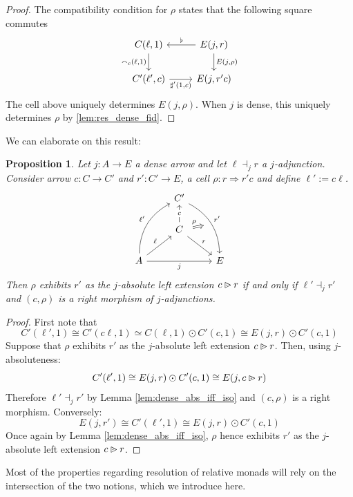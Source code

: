 \documentclass[10pt,a4paper]{article}
\newcommand{\To}{\Rightarrow}
\newcommand{\plext}{\mathbin{{\rhd}\mathclap{\mspace{-17.5mu}\cdot}}}
\newcommand{\simeqq}{\cong}
\theoremstyle{plain}
\newtheorem{proposition}[theorem]{Proposition}
\theoremstyle{definition}
\theoremstyle{remark}
\begin{document}
\begin{proof}
    The compatibility condition for $\rho$ states that the following square commutes
    \[\begin{tikzcd}
        \ar[d, "{\smallfrown_c(\ell, 1)}"'] C(\ell, 1) & \ar[l, "\flat"'] E(j, r) \ar[d, "{E(j, \rho)}"]\\
        C'(\ell', c) \ar[r, "{\sharp'(1, c)}"'] & E(j, r'c)
    \end{tikzcd}\]
    The cell above uniquely determines $E(j, \rho)$. When $j$ is dense, this uniquely determines $\rho$ by \ref{lem:res_dense_fid}.
\end{proof}

We can elaborate on this result:

\begin{proposition}
    \label{prop:radj_rm_iff_abslext}
    Let $j : A \to E$ a dense arrow and let $\ell\dashv_jr$ a $j$-adjunction. Consider arrow $c : C \to C'$ and $r' : C' \to E$, a cell $\rho : r \To r'c$ and define $\ell' := c\ell$.
    \[\begin{tikzcd}
        &C'\ar[ddr, "r'", bend left, ""{anchor=center,name=a}]&\\
        &\ar[u, "c"{description}] C \ar[dr, "r"]\\
        A \ar[uur, bend left, "\ell'"] \ar[ur, "\ell"] \ar[rr, "j"'] && E
        \ar[from=2-2, to=a, Rightarrow, "\rho", shorten=2mm]
    \end{tikzcd}\]
    Then $\rho$ exhibits $r'$ as the $j$-absolute left extension $c \plext r$ if and only if $\ell'\dashv_jr'$ and $(c, \rho)$ is a right morphism of $j$-adjunctions.
\end{proposition}

\begin{proof}
    First note that
    $$C'(\ell', 1) \simeqq C'(c\ell, 1) \simeq C(\ell, 1) \odot C'(c, 1) \simeqq E(j, r) \odot C'(c, 1)$$
    Suppose that $\rho$ exhibits $r'$ as the $j$-absolute left extension $c \plext r$. Then, using $j$-absoluteness:
    $$C'(\ell', 1) \simeqq E(j, r) \odot C'(c, 1) \simeqq E(j, c\plext r)$$
    Therefore $\ell'\dashv_jr'$ by Lemma \ref{lem:dense_abs_iff_iso} and $(c, \rho)$ is a right morphism. Conversely:
    $$E(j, r') \simeqq C'(\ell', 1) \simeqq E(j, r) \odot C'(c, 1)$$
    Once again by Lemma \ref{lem:dense_abs_iff_iso}, $\rho$ hence exhibits $r'$ as the $j$-absolute left extension $c\plext r$.
\end{proof}

Most of the properties regarding resolution of relative monads will rely on the intersection of the two notions, which we introduce here.
\end{document}
